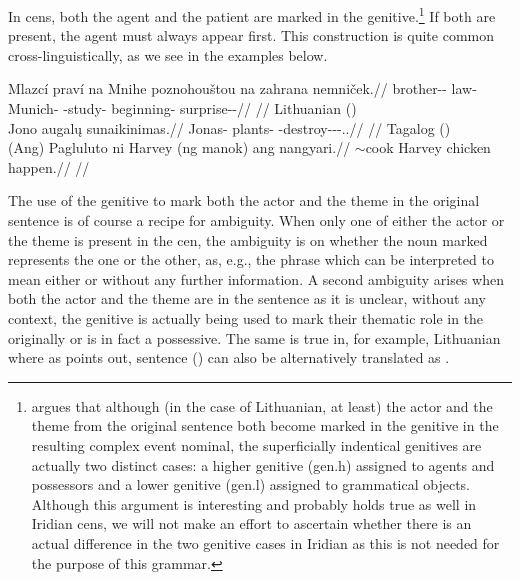 In {\sc cen}s, both the agent and the patient are marked in the
genitive.\footnote{\textcite{serekaite2020} argues that although
(in the case of Lithuanian, at least) the actor and the theme from the original
sentence both become marked in the genitive in the resulting complex event
nominal, the superficially indentical genitives are actually two distinct cases:
a higher genitive ({\sc gen.h}) assigned to agents and possessors and a lower
genitive ({\sc gen.l}) assigned to grammatical objects. Although this argument
is interesting and probably holds true as well in Iridian {\sc cen}s, we will
not make an effort to ascertain whether there is an actual difference in the two
genitive cases in Iridian as this is not needed for the purpose of this
grammar.} If both are present, the agent must always appear first. This
construction is quite common cross-linguistically, as we see in the examples
below.

\pex
\a\begingl
    \gla Mlazcí praví na Mnihe poznohouštou na zahrana nemniček.//
    \glb brother-\Dim{}-\Gen{} law-\Gen{} \Loc{} Munich-\Acc{} \Ger{}-study-\Nz{} \Loc{} beginning-\Acc{} surprise-\Av{}-\Pf{}//
    \glft {}//
\endgl
\a Lithuanian (\cite[1]{serekaite2020})\\
\begingl
    \gla Jono augalų sunaikinimas.//
    \glb Jonas-\Gen{} plants-\Gen{} \Pfv{}-destroy-\Caus{}-\Nz-\Nom{}.\M{}.\Sg{}//
    \glft {}//
\endgl
\a Tagalog (\cite[22]{hsieh2019})\\
\begingl
    \gla (Ang) Pagluluto ni Harvey (ng manok) ang nangyari.//
    \glb \Nom{} \Ger{}$\sim$cook \Gen{} Harvey \Gen{} chicken \Nom{} happen.\Pfv{}//
    \glft {}//
\endgl
\xe

The use of the genitive to mark both the actor and the theme in
the original sentence is of course a recipe for ambiguity. When only one of
either the actor or the theme is present in the {\sc cen}, the ambiguity is on
whether the noun marked represents the one or the other, as, e.g., the phrase
 which can be interpreted to mean either  or  without any further
information. A second ambiguity arises when both the actor and the theme are in
the sentence as it is unclear, without any context, the genitive is actually
being used to mark their thematic role in the originally or is in fact a
possessive. The same is true in, for example, Lithuanian where
as \textcite{serekaite2020} points out, sentence
() can also be alternatively translated as
.

